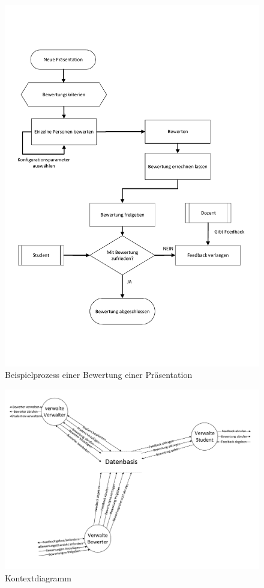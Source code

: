 \documentclass[a4paper,listof=leveldown,listof=numbered]{scrreprt}
\begin{document}
	\begin{figure}[H]
		\centering
		\includegraphics[height=0.9\textheight]{../Diagramme/Beispiel-FlussdiagrPraesi.pdf}
		\caption{Beispielprozess einer Bewertung einer Präsentation}
	\end{figure}
	\begin{figure}[H]
		\centering
		\includegraphics[width=1.4\textwidth, angle=90, origin=c]{../Diagramme/Kontextdiagramm_DFD0.pdf}
		\caption{Kontextdiagramm}
	\end{figure}
\end{document}
